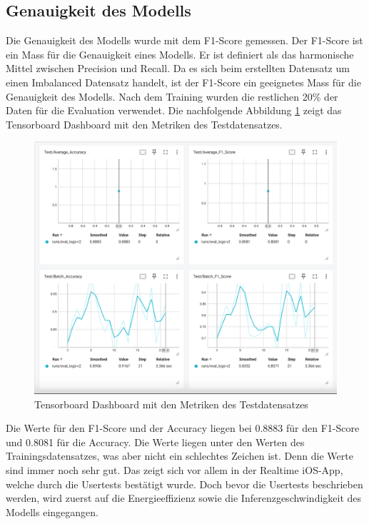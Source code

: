 \documentclass[11pt,a4paper]{article}
\begin{document}
\subsection{Genauigkeit des Modells}
Die Genauigkeit des Modells wurde mit dem F1-Score gemessen. Der F1-Score ist ein Mass für die 
Genauigkeit eines Modells. Er ist definiert als das harmonische Mittel zwischen Precision und 
Recall. Da es sich beim erstellten Datensatz um einen Imbalanced Datensatz handelt, ist der F1-Score 
ein geeignetes Mass für die Genauigkeit des Modells. Nach dem Training wurden die restlichen 
20\% der Daten für die Evaluation verwendet. Die nachfolgende Abbildung \ref{fig:test} zeigt das 
Tensorboard Dashboard mit den Metriken des Testdatensatzes. 

\begin{figure}[H]
	\centering
	\includegraphics[width=1.0\linewidth]{img/test/test.png}
	\caption{Tensorboard Dashboard mit den Metriken des Testdatensatzes}
	\label{fig:test}	
\end{figure}

\noindent \newline
Die Werte für den F1-Score und der Accuracy liegen bei 0.8883 für den F1-Score und 0.8081 für die 
Accuracy. Die Werte liegen unter den Werten des Trainingsdatensatzes, was aber nicht ein schlechtes 
Zeichen ist. Denn die Werte sind immer noch sehr gut. Das zeigt sich vor allem in der Realtime 
iOS-App, welche durch die Usertests bestätigt wurde. Doch bevor die Usertests beschrieben werden, 
wird zuerst auf die Energieeffizienz sowie die Inferenzgeschwindigkeit des Modells eingegangen.
\end{document}

